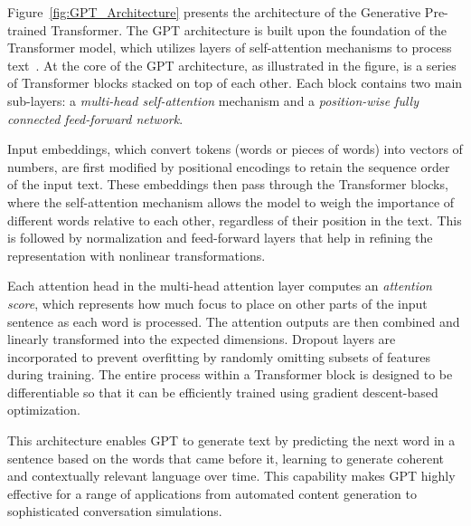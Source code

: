 Figure~\ref{fig:GPT_Architecture} presents the architecture of the Generative Pre-trained Transformer. The GPT architecture is built upon the foundation of the Transformer model, which utilizes layers of self-attention mechanisms to process text~\cite{wolf2020transformers}. At the core of the GPT architecture, as illustrated in the figure, is a series of Transformer blocks stacked on top of each other. Each block contains two main sub-layers: a \textit{multi-head self-attention} mechanism and a \textit{position-wise fully connected feed-forward network}.

Input embeddings, which convert tokens (words or pieces of words) into vectors of numbers, are first modified by positional encodings to retain the sequence order of the input text. These embeddings then pass through the Transformer blocks, where the self-attention mechanism allows the model to weigh the importance of different words relative to each other, regardless of their position in the text. This is followed by normalization and feed-forward layers that help in refining the representation with nonlinear transformations.

Each attention head in the multi-head attention layer computes an \textit{attention score}, which represents how much focus to place on other parts of the input sentence as each word is processed. The attention outputs are then combined and linearly transformed into the expected dimensions. Dropout layers are incorporated to prevent overfitting by randomly omitting subsets of features during training. The entire process within a Transformer block is designed to be differentiable so that it can be efficiently trained using gradient descent-based optimization.

This architecture enables GPT to generate text by predicting the next word in a sentence based on the words that came before it, learning to generate coherent and contextually relevant language over time. This capability makes GPT highly effective for a range of applications from automated content generation to sophisticated conversation simulations.

